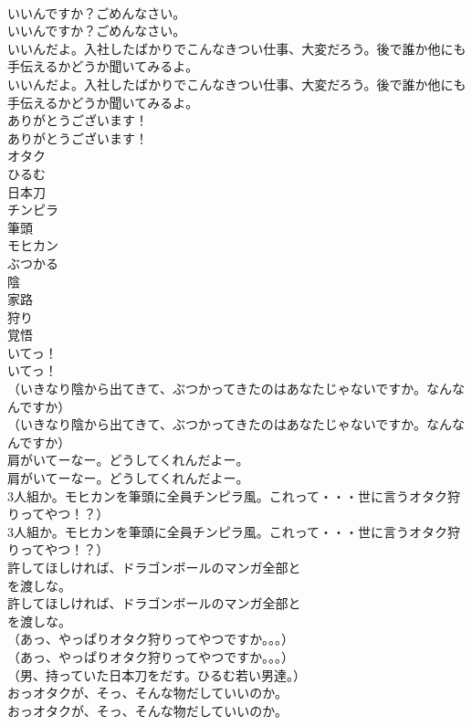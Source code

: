 \documentclass[8pt]{extreport}
\begin{document}
\begin{CJK}{UTF8}{min}
\\	いいんですか？ごめんなさい。	
\\	いいんですか？ごめんなさい。 
\\	いいんだよ。入社したばかりでこんなきつい仕事、大変だろう。後で誰か他にも手伝えるかどうか聞いてみるよ。	
\\	いいんだよ。入社したばかりでこんなきつい仕事、大変だろう。後で誰か他にも手伝えるかどうか聞いてみるよ。 
\\	ありがとうございます！	
\\	ありがとうございます！ 
\\	オタク
\\	ひるむ
\\	日本刀
\\	チンピラ
\\	筆頭
\\	モヒカン
\\	ぶつかる
\\	陰
\\	家路
\\	狩り
\\	覚悟
\\	いてっ！	
\\	いてっ！ 
\\	（いきなり陰から出てきて、ぶつかってきたのはあなたじゃないですか。なんなんですか）	
\\	（いきなり陰から出てきて、ぶつかってきたのはあなたじゃないですか。なんなんですか） 
\\	肩がいてーなー。どうしてくれんだよー。	
\\	肩がいてーなー。どうしてくれんだよー。 
\\	3人組か。モヒカンを筆頭に全員チンピラ風。これって・・・世に言うオタク狩りってやつ！？）	
\\	3人組か。モヒカンを筆頭に全員チンピラ風。これって・・・世に言うオタク狩りってやつ！？） 
\\	許してほしければ、ドラゴンボールのマンガ全部と
\\	を渡しな。	
\\	許してほしければ、ドラゴンボールのマンガ全部と
\\	を渡しな。 
\\	（あっ、やっぱりオタク狩りってやつですか。。。）	
\\	（あっ、やっぱりオタク狩りってやつですか。。。） 
\\	（男、持っていた日本刀をだす。ひるむ若い男達。）	
\\	おっオタクが、そっ、そんな物だしていいのか。	
\\	おっオタクが、そっ、そんな物だしていいのか。 

\end{CJK}
\end{document}
